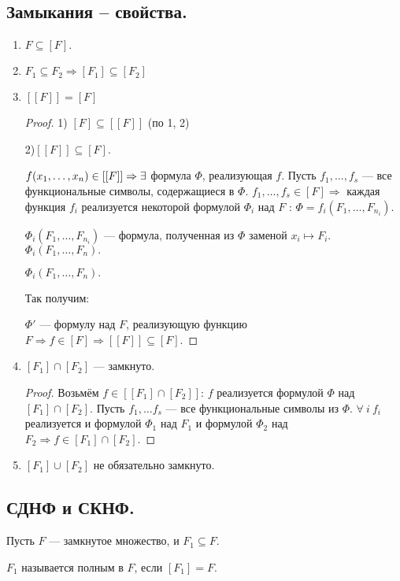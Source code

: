 \subsection{Замыкания -- свойства.}
\begin{enumerate}
	\item $F \subseteq [F].$
	\item $F_1 \subseteq F_2 \Longrightarrow [F_1] \subseteq [F_2]$
	\item $[[F]] = [F]$
	\begin{proof}
		1) $[F] \subseteq [[F]]$ (по 1, 2)

		2)$[[F]] \subseteq [F]$.

		$f(x_1, \ldots, x_n) \in [[F]] \Rightarrow \exists$ формула $\Phi$, реализующая $f$. Пусть $f_1, \ldots, f_s$ --- все функциональные символы, содержащиеся в $\Phi$. $f_1, \ldots, f_s \in [F] \Rightarrow $ каждая функция $f_i$ реализуется некоторой формулой $\Phi_i$ над $F$ : $\Phi = f_i(F_1, \ldots, F_{n_i})$.

		$\Phi_i(F_1, \ldots, F_{n_i})$ --- формула, полученная из $\Phi$ заменой $x_i \longmapsto F_i$. $\Phi_i(F_1, \ldots, F_n).$

		$\Phi_i(F_1, \ldots, F_n).$

		Так получим: 

		$\Phi'$ --- формулу над $F$, реализующую функцию $F \Rightarrow f \in [F] \Rightarrow [[F]] \subseteq [F]$.
	\end{proof}
	\item  $[F_1] \cap [F_2]$ --- замкнуто.
	\begin{proof}
		Возьмём $f \in [[F_1] \cap [F_2]]$: $f$ реализуется формулой $\Phi$ над $[F_1] \cap [F_2]$. Пусть $f_1, \ldots f_s$ --- все функциональные символы из $\Phi$. $\forall \: i \: f_i$ реализуется и формулой $\Phi_1$ над $F_1$ и формулой $\Phi_2$ над $F_2 \Rightarrow f \in  [F_1] \cap [F_2]$.
	\end{proof}
	\item  $[F_1] \cup [F_2]$ не обязательно замкнуто.
\end{enumerate}

\subsection{СДНФ и СКНФ.}
Пусть $F$ --- замкнутое множество, и $F_1 \subseteq F$.

\begin{definition}
	$F_1$ называется полным в $F$, если $[F_1] = F$.
\end{definition}

